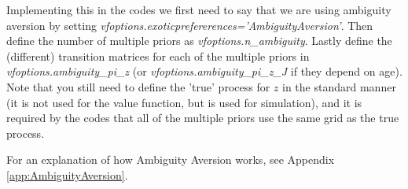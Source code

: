 Implementing this in the codes we first need to say that we are using ambiguity aversion by setting \textit{vfoptions.exoticprefererences='AmbiguityAversion'}. Then define the number of multiple priors as \textit{vfoptions.n\_{}ambiguity}. Lastly define the (different) transition matrices for each of the multiple priors in \textit{vfoptions.ambiguity\_{}pi\_{}z} (or \textit{vfoptions.ambiguity\_{}pi\_{}z\_{}J} if they depend on age). Note that you still need to define the 'true' process for $z$ in the standard manner (it is not used for the value function, but is used for simulation), and it is required by the codes that all of the multiple priors use the same grid as the true process.

For an explanation of how Ambiguity Aversion works, see Appendix \ref{app:AmbiguityAversion}.




